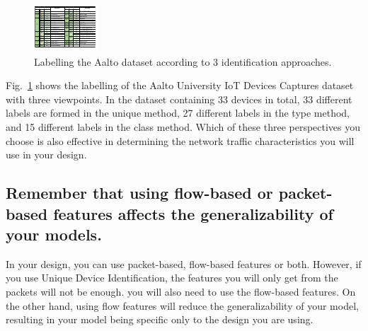 \documentclass[journal]{IEEEtran}
\begin{document}
\begin{figure}[ht]
	\centerline{\includegraphics[width=1\columnwidth]{images/tablo3.pdf}}
	\caption{Labelling the Aalto dataset according to 3 identification approaches.}
	\label{fig:comparedata}
\end{figure}


Fig.~\ref{fig:comparedata} shows the labelling of the Aalto University IoT Devices Captures 
dataset~\cite{aalto2017dataset} with three viewpoints. In the dataset containing 33 devices in total, 33 different labels are formed in the unique method, 27 different labels in the type method, and 15 different labels in the class method. Which of these three perspectives you choose is also effective in determining the network traffic characteristics you will use in your design. 

\subsection{Remember that using flow-based or packet-based features affects the generalizability of your models.}
In your design, you can use packet-based, flow-based features or both. However, if you use Unique Device Identification, the features you will only get from the packets will not be enough.  you will also need to use the flow-based features. On the other hand, using flow features will reduce the generalizability of your model, resulting in your model being specific only to the design you are using. 
\end{document}
